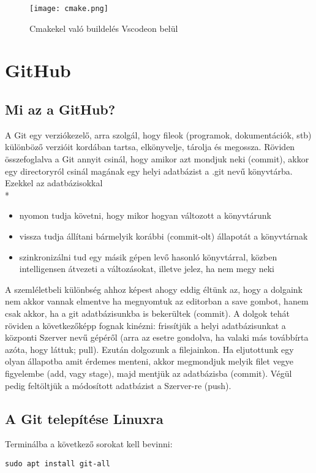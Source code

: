 \documentclass[a4paper, 12pt]{article}
\begin{document}
\begin{figure}[h!]
\begin{center}
\texttt{[image: cmake.png]}
\caption*{Cmakekel való buildelés Vscodeon belül}
\end{center}
\end{figure}

\section{GitHub}
\subsection{Mi az a GitHub?}
A Git egy verziókezelő, arra szolgál, hogy fileok (programok, dokumentációk, stb) különböző verzióit kordában tartsa, elkönyvelje, tárolja és megossza. Röviden összefoglalva a Git annyit csinál, hogy amikor azt mondjuk neki (commit), akkor egy directoryról csinál magának egy helyi adatbázist a .git nevű könyvtárba. Ezekkel az adatbázisokkal \\*
\begin{itemize}
\item nyomon tudja követni, hogy mikor hogyan változott a könyvtárunk
\item vissza tudja állítani bármelyik korábbi (commit-olt) állapotát a könyvtárnak
\item szinkronizálni tud egy másik gépen levő hasonló könyvtárral, közben intelligensen átvezeti a változásokat, illetve jelez, ha nem megy neki
\end{itemize}
A szemléletbeli különbség ahhoz képest ahogy eddig éltünk az, hogy a dolgaink nem akkor vannak elmentve ha megnyomtuk az editorban a save gombot, hanem csak akkor, ha a git adatbázisunkba is bekerültek (commit). A dolgok tehát röviden a következőképp fognak kinézni: frissítjük a helyi adatbázisunkat a központi Szerver nevű gépéről (arra az esetre gondolva, ha valaki más továbbírta azóta, hogy láttuk; pull). Ezután dolgozunk a filejainkon. Ha eljutottunk egy olyan állapotba amit érdemes menteni, akkor megmondjuk melyik filet vegye figyelembe (add, vagy stage), majd mentjük az adatbázisba (commit). Végül pedig feltöltjük a módosított adatbázist a Szerver-re (push).

\subsection{A Git telepítése Linuxra}
Terminálba a következő sorokat kell bevinni:
\begin{verbatim}
sudo apt install git-all
\end{verbatim}
\end{document}
